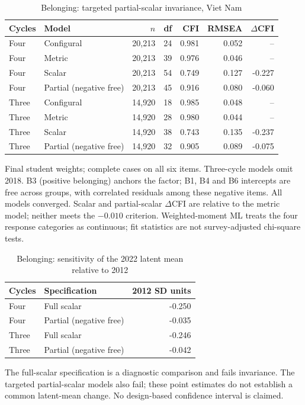 \begin{table}[H]\centering\scriptsize
\caption{Belonging: targeted partial-scalar invariance, Viet Nam}\label{tab:partial}
\begin{tabular}{@{}llrrrrr@{}}
\toprule
Cycles & Model & $n$ & df & CFI & RMSEA & $\Delta$CFI\\
\midrule
Four & Configural & 20,213 & 24 & 0.981 & 0.052 & --\\
Four & Metric & 20,213 & 39 & 0.976 & 0.046 & --\\
Four & Scalar & 20,213 & 54 & 0.749 & 0.127 & -0.227\\
Four & Partial (negative free) & 20,213 & 45 & 0.916 & 0.080 & -0.060\\
Three & Configural & 14,920 & 18 & 0.985 & 0.048 & --\\
Three & Metric & 14,920 & 28 & 0.980 & 0.044 & --\\
Three & Scalar & 14,920 & 38 & 0.743 & 0.135 & -0.237\\
Three & Partial (negative free) & 14,920 & 32 & 0.905 & 0.089 & -0.075\\
\bottomrule
\end{tabular}
\par\smallskip\raggedright\footnotesize Final student weights; complete cases on all six items. Three-cycle models omit 2018. B3 (positive belonging) anchors the factor; B1, B4 and B6 intercepts are free across groups, with correlated residuals among these negative items. All models converged. Scalar and partial-scalar $\Delta$CFI are relative to the metric model; neither meets the $-0.010$ criterion. Weighted-moment ML treats the four response categories as continuous; fit statistics are not survey-adjusted chi-square tests.
\end{table}

\begin{table}[H]\centering\scriptsize
\caption{Belonging: sensitivity of the 2022 latent mean relative to 2012}\label{tab:partialmeans}
\begin{tabular}{@{}llr@{}}
\toprule
Cycles & Specification & 2012 SD units\\
\midrule
Four & Full scalar & -0.250\\
Four & Partial (negative free) & -0.035\\
Three & Full scalar & -0.246\\
Three & Partial (negative free) & -0.042\\
\bottomrule
\end{tabular}
\par\smallskip\raggedright\footnotesize The full-scalar specification is a diagnostic comparison and fails invariance. The targeted partial-scalar models also fail; these point estimates do not establish a common latent-mean change. No design-based confidence interval is claimed.
\end{table}

